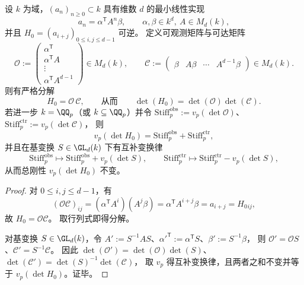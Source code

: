 \begin{proposition}\label{prop:xi-hankel-det-reach-observe-factorization-padic}
设 \(k\) 为域，\((a_n)_{n\ge 0}\subset k\) 具有维数 \(d\) 的最小线性实现
\[
a_n=\alpha^{\mathsf T}A^n\beta,
\qquad
\alpha,\beta\in k^d,\ A\in M_d(k),
\]
并且 \(H_0=(a_{i+j})_{0\le i,j\le d-1}\) 可逆。
定义可观测矩阵与可达矩阵
\[
\mathcal O:=
\begin{pmatrix}
\alpha^{\mathsf T}\\
\alpha^{\mathsf T}A\\
\vdots\\
\alpha^{\mathsf T}A^{d-1}
\end{pmatrix}\in M_d(k),
\qquad
\mathcal C:=
\begin{pmatrix}
\beta & A\beta & \cdots & A^{d-1}\beta
\end{pmatrix}\in M_d(k).
\]
则有严格分解
\[
H_0=\mathcal O\,\mathcal C,
\qquad\text{从而}\qquad
\det(H_0)=\det(\mathcal O)\det(\mathcal C).
\]
若进一步 \(k=\QQ_p\)（或 \(k\subseteq\QQ_p\)）并令
\(
\mathrm{Stiff}^{\mathrm{obs}}_p:=v_p(\det\mathcal O)
\)、\(
\mathrm{Stiff}^{\mathrm{ctr}}_p:=v_p(\det\mathcal C)
\)，
则
\[
v_p(\det H_0)=\mathrm{Stiff}^{\mathrm{obs}}_p+\mathrm{Stiff}^{\mathrm{ctr}}_p,
\]
并且在基变换 \(S\in \GL_d(k)\) 下有互补变换律
\[
\mathrm{Stiff}^{\mathrm{obs}}_p\mapsto \mathrm{Stiff}^{\mathrm{obs}}_p+v_p(\det S),
\qquad
\mathrm{Stiff}^{\mathrm{ctr}}_p\mapsto \mathrm{Stiff}^{\mathrm{ctr}}_p-v_p(\det S),
\]
从而总刚性 \(v_p(\det H_0)\) 不变。
\end{proposition}
\begin{proof}
对 \(0\le i,j\le d-1\)，有
\[
(\mathcal O\mathcal C)_{ij}=(\alpha^{\mathsf T}A^i)(A^j\beta)=\alpha^{\mathsf T}A^{i+j}\beta=a_{i+j}=H_0{}_{ij},
\]
故 \(H_0=\mathcal O\mathcal C\)。
取行列式即得分解。
\par
对基变换 \(S\in\GL_d(k)\)，令
\(
A':=S^{-1}AS
\)、\(
\alpha'^{\mathsf T}:=\alpha^{\mathsf T}S
\)、\(
\beta':=S^{-1}\beta
\)，
则
\(
\mathcal O'=\mathcal OS
\)、\(
\mathcal C'=S^{-1}\mathcal C
\)。
因此
\(
\det(\mathcal O')=\det(\mathcal O)\det(S)
\)、
\(
\det(\mathcal C')=\det(S)^{-1}\det(\mathcal C)
\)，
取 \(v_p\) 得互补变换律，且两者之和不变并等于 \(v_p(\det H_0)\)。证毕。
\end{proof}





